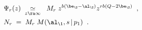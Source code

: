 \begin{equation}\label{asym2} \begin{aligned}
{}& \Psi_r(z)\;\underset{z\ra \infty}{\simeq}\;
\;M_r\;
z^{b(\be_\2-\al_\2)}
z^{rb(Q-2\be_\2)}\;\;,\\
& N_r\;=\; M_r \;M(\al_\1,s\,|\,p_1)\;\;.
\end{aligned}\end{equation}

